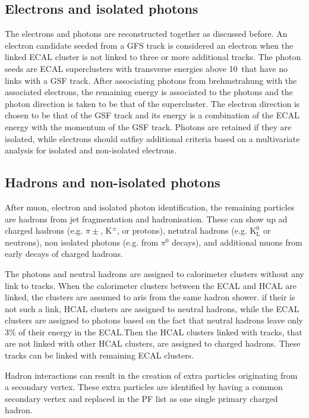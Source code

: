 \subsection{Electrons and isolated photons}
\label{sec:Electron}
The electrons and photons are reconstructed together as discussed before. An electron candidate seeded from a GFS track is considered an electron when the linked ECAL cluster is not linked to three or more additional tracks. The photon seeds are ECAL superclusters with transverse energies above 10\GeV\ that have no links with a GSF track. After associating photons from brehmstrahung with the associated electrons, the remaining energy is associated to the photons and the photon direction is taken to be that of the supercluster. The electron direction is chosen to be that of the GSF track and its energy is a combination of the ECAL energy with the momentum of the GSF track. Photons are retained if they are isolated, while electrons should satfisy additional criteria based on a multivariate analysis for isolated and non-isolated electrons. 
\subsection{Hadrons and non-isolated photons}
\label{sec:Hadron}
After muon, electron and isolated photon identification, the remaining particles are hadrons from jet fragmentation and hadronisation. These can show up ad charged hadrons (e.g. $\pi{\pm}$, $\mathrm{K}^{\pm}$, or protons), netutral hadrons (e.g. $\mathrm{K}^{0}_{\mathrm{L}}$ or neutrons), non isolated photons (e.g. from $\pi^0$ decays), and additional muons from early decays of charged hadrons. 

The photons and neutral hadrons are assigned to calorimeter clusters without any link to tracks. When the calorimeter clusters between the ECAL and HCAL are linked, the clusters are assumed to aris from the same hadron shower. if their is not such a link, HCAL clusters are assigned to neutral hadrons, while the ECAL clusters are assigned to photons based on the fact that neutral hadrons leave only 3\% of their energy in the ECAL.Then the HCAL clusters linked with tracks, that are not linked with other HCAL clusters, are assigned to charged hadrons. These tracks can be linked with remaining ECAL clusters. 

Hadron interactions can result in the creation of extra particles originating from a secondary vertex. These extra particles are identified by having a common secondary vertex and replaced in the PF list as one single primary charged hadron. 


